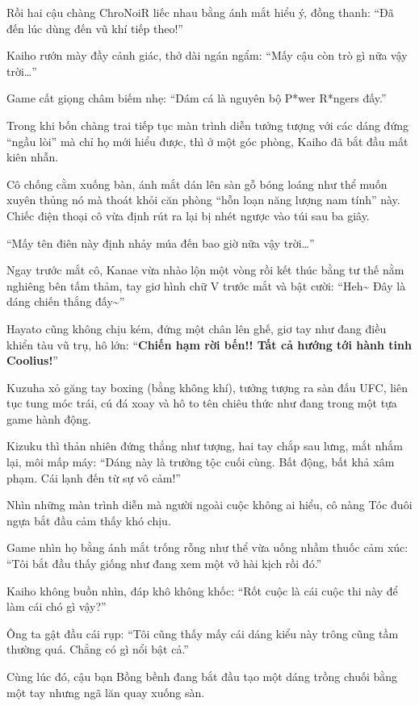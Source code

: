 \documentclass[../main.tex]{subfiles}
\begin{document}
Rồi hai cậu chàng ChroNoiR liếc nhau bằng ánh mắt hiểu ý, đồng thanh: ``Đã đến lúc dùng đến vũ khí tiếp theo!''

Kaiho rướn mày đầy cảnh giác, thở dài ngán ngẩm: ``Mấy cậu còn trò gì nữa vậy trời\dots''

Game cất giọng châm biếm nhẹ: ``Dám cá là nguyên bộ P*wer R*ngers đấy.''

\ct

Trong khi bốn chàng trai tiếp tục màn trình diễn tưởng tượng với các dáng đứng ``ngầu lòi'' mà chỉ họ mới hiểu được, thì ở một góc phòng, Kaiho đã bắt đầu mất kiên nhẫn.

Cô chống cằm xuống bàn, ánh mắt dán lên sàn gỗ bóng loáng như thể muốn xuyên thủng nó mà thoát khỏi căn phòng ``hỗn loạn năng lượng nam tính'' này. Chiếc điện thoại cô vừa định rút ra lại bị nhét ngược vào túi sau ba giây.

``Mấy tên điên này định nhảy múa đến bao giờ nữa vậy trời\dots''

Ngay trước mắt cô, Kanae vừa nhào lộn một vòng rồi kết thúc bằng tư thế nằm nghiêng bên tấm thảm, tay giơ hình chữ V trước mắt và bật cười: ``Heh\~{} Đây là dáng chiến thắng đấy\~{}''

Hayato cũng không chịu kém, đứng một chân lên ghế, giơ tay như đang điều khiển tàu vũ trụ, hô lớn: ``\textbf{Chiến hạm rời bến!! Tất cả hướng tới hành tinh Coolius!}''

Kuzuha xỏ găng tay boxing (bằng không khí), tưởng tượng ra sàn đấu UFC, liên tục tung móc trái, cú đá xoay và hô to tên chiêu thức như đang trong một tựa game hành động.

Kizuku thì thản nhiên đứng thẳng như tượng, hai tay chắp sau lưng, mắt nhắm lại, môi mấp máy: ``Dáng này là trưởng tộc cuối cùng. Bất động, bất khả xâm phạm. Cái lạnh đến từ sự vô cảm!''

Nhìn những màn trình diễn mà người ngoài cuộc không ai hiểu, cô nàng Tóc đuôi ngựa bắt đầu cảm thấy khó chịu.

Game nhìn họ bằng ánh mắt trống rỗng như thể vừa uống nhầm thuốc cảm xúc: ``Tôi bắt đầu thấy giống như đang xem một vở hài kịch rồi đó.''

Kaiho không buồn nhìn, đáp khô không khốc: ``Rốt cuộc là cái cuộc thi này để làm cái chó gì vậy?''

Ông ta gật đầu cái rụp: ``Tôi cũng thấy mấy cái dáng kiểu này trông cũng tầm thường quá. Chẳng có gì nổi bật cả.''

Cùng lúc đó, cậu bạn Bồng bềnh đang bắt đầu tạo một dáng trồng chuối bằng một tay nhưng ngã lăn quay xuống sàn.
\end{document}
